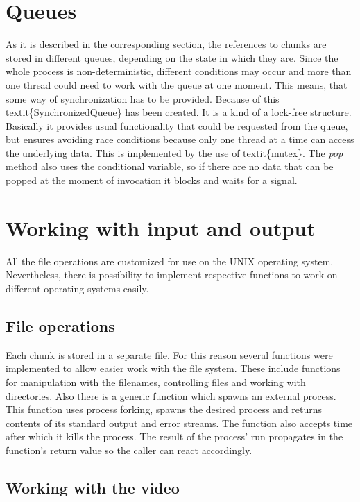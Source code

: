 \section{Queues}\label{queues}

As it is described in the corresponding
\hyperref[distribution-of-chunks]{section}, the references to chunks are
stored in different queues, depending on the state in which they are.
Since the whole process is non-deterministic, different conditions may
occur and more than one thread could need to work with the queue at one
moment. This means, that some way of synchronization has to be provided.
Because of this textit\{SynchronizedQueue\} has been created. It is a
kind of a lock-free structure. Basically it provides usual functionality
that could be requested from the queue, but ensures avoiding race
conditions because only one thread at a time can access the underlying
data. This is implemented by the use of textit\{mutex\}. The
\textit{pop} method also uses the conditional variable, so if there are
no data that can be popped at the moment of invocation it blocks and
waits for a signal.

\section{Working with input and
output}\label{working-with-input-and-output}

All the file operations are customized for use on the UNIX operating
system. Nevertheless, there is possibility to implement respective
functions to work on different operating systems easily.

\subsection*{File operations}

Each chunk is stored in a separate file. For this reason several
functions were implemented to allow easier work with the file system.
These include functions for manipulation with the filenames, controlling
files and working with directories. Also there is a generic function
which spawns an external process. This function uses process forking,
spawns the desired process and returns contents of its standard output
and error streams. The function also accepts time after which it kills
the process. The result of the process' run propagates in the function's
return value so the caller can react accordingly.

\subsection*{Working with the video}

